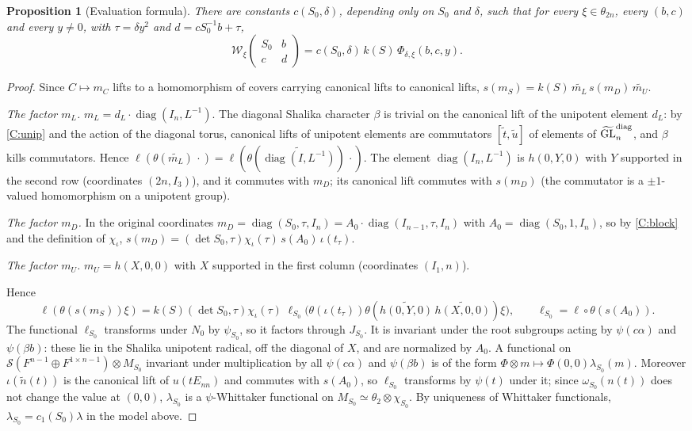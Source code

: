 \documentclass[11pt,oneside,notitlepage]{book}
\numberwithin{equation}{section}
\theoremstyle{plain}
\newtheorem{proposition}[theorem]{Proposition}
\theoremstyle{definition}
\newcommand{\GL}{\mathrm{GL}}
\newcommand{\cS}{\mathcal{S}}
\newcommand{\cW}{\mathcal{W}}
\newcommand{\tGL}{\widetilde{\GL}}
\newcommand{\diag}{\operatorname{diag}}
\newcommand{\hil}[2]{(#1,#2)}
\begin{document}
\begin{proposition}[Evaluation formula]\label{prop:jacobi}
	There are constants $c(S_0,\delta)$, depending only on $S_0$ and $\delta$, such that for every $\xi\in\theta_{2n}$, every $(b,c)$ and every $y\ne0$, with $\tau =\delta y^2$ and $d=cS_0^{-1}b+\tau $,
	\[\cW_\xi\begin{pmatrix}S_0&b\\c&d\end{pmatrix}=c(S_0,\delta)\,k(S)\,\Phi_{\delta,\xi}(b,c,y).\]
\end{proposition}
\begin{proof}
	Since $C\mapsto m_C$ lifts to a homomorphism of covers carrying canonical lifts to canonical lifts, $s(m_S)=k(S)\,\widetilde{m_L}\,s(m_D)\,\widetilde{m_U}$.
	
	\emph{The factor $m_L$.} $m_L=d_L\cdot\diag(I_n,L^{-1})$. The diagonal Shalika character $\beta$ is trivial on the canonical lift of the unipotent element $d_L$: by \ref{C:unip} and the action of the diagonal torus, canonical lifts of unipotent elements are commutators $[\tilde t,\tilde u]$ of elements of $\tGL_n^{\rm diag}$, and $\beta$ kills commutators. Hence $\ell(\theta(\widetilde{m_L})\,\cdot)=\ell(\theta(\widetilde{\diag(I,L^{-1})})\,\cdot)$. The element $\diag(I_n,L^{-1})$ is $h(0,Y,0)$ with $Y$ supported in the second row (coordinates $(2n,I_3)$), and it commutes with $m_D$; its canonical lift commutes with $s(m_D)$ (the commutator is a $\pm1$-valued homomorphism on a unipotent group).
	
	\emph{The factor $m_D$.} In the original coordinates $m_D=\diag(S_0,\tau ,I_n)=A_0\cdot\diag(I_{n-1},\tau ,I_n)$ with $A_0=\diag(S_0,1,I_n)$, so by \ref{C:block} and the definition of $\chi_\iota$, $s(m_D)=\hil{\det S_0}{\tau }\chi_\iota(\tau )\,s(A_0)\,\iota(t_\tau )$.
	
	\emph{The factor $m_U$.} $m_U=h(X,0,0)$ with $X$ supported in the first column (coordinates $(I_1,n)$).
	
	Hence
	\[\ell(\theta(s(m_S))\xi)=k(S)\hil{\det S_0}{\tau }\chi_\iota(\tau )\;\ell_{S_0}\bigl(\theta(\iota(t_\tau ))\theta(\widetilde{h(0,Y,0)}\,\widetilde{h(X,0,0)})\xi\bigr),\qquad\ell_{S_0}=\ell\circ\theta(s(A_0)).\]
	The functional $\ell_{S_0}$ transforms under $N_0$ by $\psi_{S_0}$, so it factors through $J_{S_0}$. It is invariant under the root subgroups acting by $\psi(c\alpha)$ and $\psi(\beta b)$: these lie in the Shalika unipotent radical, off the diagonal of $X$, and are normalized by $A_0$. A functional on $\cS(F^{n-1}\oplus F^{1\times n-1})\otimes M_{S_0}$ invariant under multiplication by all $\psi(c\alpha)$ and $\psi(\beta b)$ is of the form $\Phi\otimes m\mapsto\Phi(0,0)\lambda_{S_0}(m)$. Moreover $\iota(\tilde n(t))$ is the canonical lift of $u(tE_{nn})$ and commutes with $s(A_0)$, so $\ell_{S_0}$ transforms by $\psi(t)$ under it; since $\omega_{S_0}(n(t))$ does not change the value at $(0,0)$, $\lambda_{S_0}$ is a $\psi$-Whittaker functional on $M_{S_0}\simeq\theta_2\otimes\chi_{S_0}$. By uniqueness of Whittaker functionals, $\lambda_{S_0}=c_1(S_0)\lambda$ in the model above.
	

\end{proof}
\end{document}
